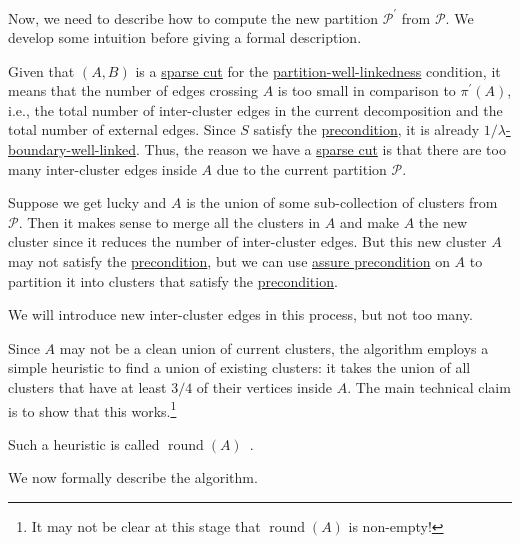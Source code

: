 Now, we need to describe how to compute the new partition \(\mathcal{P} ^{\prime} \) from \(\mathcal{P} \). We develop some intuition before giving a formal description.

\begin{intuition}
	Given that \((A, B)\) is a \hyperref[prb:sparsest-cut]{sparse cut} for the \hyperref[def:partition-and-boundary-well-linked]{partition-well-linkedness} condition, it means that the number of edges crossing \(A\) is too small in comparison to \(\pi ^{\prime} (A)\), i.e., the total number of inter-cluster edges in the current decomposition and the total number of external edges. Since \(S\) satisfy the \hyperref[def:precondition]{precondition}, it is already \hyperref[def:boundary-well-linked]{\(1 / \lambda \)-boundary-well-linked}. Thus, the reason we have a \hyperref[prb:sparsest-cut]{sparse cut} is that there are too many inter-cluster edges inside \(A\) due to the current partition \(\mathcal{P} \).

	Suppose we get lucky and \(A\) is the union of some sub-collection of clusters from \(\mathcal{P} \). Then it makes sense to merge all the clusters in \(A\) and make \(A\) the new cluster since it reduces the number of inter-cluster edges. But this new cluster \(A\) may not satisfy the \hyperref[def:precondition]{precondition}, but we can use \hyperref[algo:assure-precondition]{assure precondition} on \(A\) to partition it into clusters that satisfy the \hyperref[def:precondition]{precondition}.

	\begin{remark}
		We will introduce new inter-cluster edges in this process, but not too many.
	\end{remark}

	Since \(A\) may not be a clean union of current clusters, the algorithm employs a simple heuristic to find a union of existing clusters: it takes the union of all clusters that have at least \(3 / 4\) of their vertices inside \(A\). The main technical claim is to show that this works.\footnote{It may not be clear at this stage that \(\operatorname{round}(A) \) is non-empty!}
\end{intuition}

\begin{notation}
	Such a heuristic is called \(\operatorname{round}(A) \)~\cite{abraham2008nearly}.
\end{notation}

We now formally describe the algorithm.

